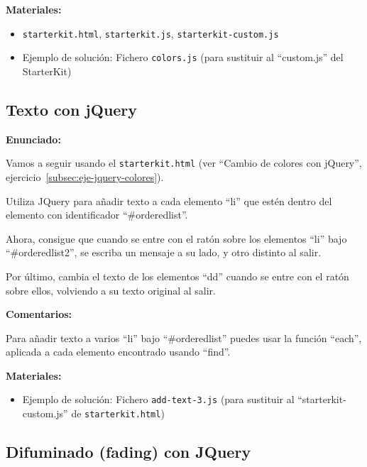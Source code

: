 \textbf{Materiales:}

\begin{itemize}
\item \verb|starterkit.html|, \verb|starterkit.js|, \verb|starterkit-custom.js|
\item Ejemplo de solución: Fichero \verb|colors.js|
  (para sustituir al ``custom.js'' del StarterKit)
\end{itemize}

\subsection{Texto con jQuery}
\label{subsec:eje-jquery-texto}

\textbf{Enunciado:}

Vamos a seguir usando el \verb|starterkit.html| (ver ``Cambio de colores con jQuery'', ejercicio~\ref{subsec:eje-jquery-colores}).

Utiliza JQuery para añadir texto a cada elemento ``li'' que estén dentro del elemento con identificador ``\#orderedlist''. 

Ahora, consigue que cuando se entre con el ratón sobre los elementos ``li'' bajo ``\#orderedlist2'', se escriba un mensaje a su lado, y otro distinto al salir.

Por último, cambia el texto de los elementos ``dd'' cuando se entre con el ratón sobre ellos, volviendo a su texto original al salir.

\textbf{Comentarios:}

Para añadir texto a varios ``li'' bajo ``\#orderedlist'' puedes usar la función ``each'', aplicada a cada elemento encontrado usando ``find''.

\textbf{Materiales:}

\begin{itemize}
\item Ejemplo de solución: Fichero \verb|add-text-3.js|
  (para sustituir al ``starterkit-custom.js'' de \verb|starterkit.html|)
\end{itemize}

\subsection{Difuminado (fading) con JQuery}
\label{subsec:eje-jquery-fading}

